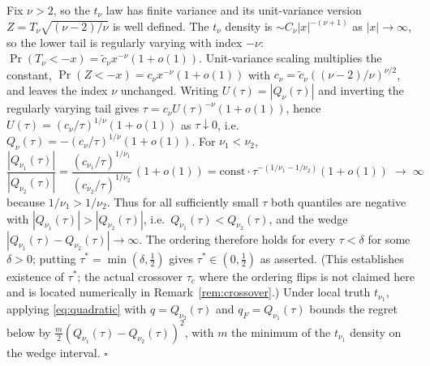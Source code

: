 \documentclass[11pt]{article}
\theoremstyle{remark}
\begin{document}
Fix $\nu>2$, so the $t_\nu$ law has finite variance and its
unit-variance version $Z=T_\nu\sqrt{(\nu-2)/\nu}$ is well defined. The
$t_\nu$ density is $\sim C_\nu|x|^{-(\nu+1)}$ as $|x|\to\infty$, so the
lower tail is regularly varying with index $-\nu$: $\Pr(T_\nu<-x)=
\tilde c_\nu x^{-\nu}(1+o(1))$. Unit-variance scaling multiplies the
constant, $\Pr(Z<-x)=c_\nu x^{-\nu}(1+o(1))$ with
$c_\nu=\tilde c_\nu((\nu-2)/\nu)^{\nu/2}$, and leaves the index $\nu$
unchanged. Writing $U(\tau)=|Q_\nu(\tau)|$ and inverting the regularly
varying tail \citep{embrechts1997} gives $\tau=c_\nu U(\tau)^{-\nu}
(1+o(1))$, hence $U(\tau)=(c_\nu/\tau)^{1/\nu}(1+o(1))$ as
$\tau\downarrow0$, i.e.\ $Q_\nu(\tau)=-(c_\nu/\tau)^{1/\nu}(1+o(1))$.
For $\nu_1<\nu_2$,
\[
\frac{|Q_{\nu_1}(\tau)|}{|Q_{\nu_2}(\tau)|}
=\frac{(c_{\nu_1}/\tau)^{1/\nu_1}}{(c_{\nu_2}/\tau)^{1/\nu_2}}\,(1+o(1))
=\text{const}\cdot\tau^{-(1/\nu_1-1/\nu_2)}(1+o(1))\;\longrightarrow\;\infty
\]
because $1/\nu_1>1/\nu_2$. Thus for all sufficiently small $\tau$ both
quantiles are negative with $|Q_{\nu_1}(\tau)|>|Q_{\nu_2}(\tau)|$, i.e.\
$Q_{\nu_1}(\tau)<Q_{\nu_2}(\tau)$, and the wedge
$|Q_{\nu_1}(\tau)-Q_{\nu_2}(\tau)|\to\infty$. The ordering therefore
holds for every $\tau<\delta$ for some $\delta>0$; putting
$\tau^*=\min(\delta,\tfrac12)$ gives $\tau^*\in(0,\tfrac12)$ as
asserted. (This establishes existence of $\tau^*$; the actual
crossover $\tau_c$ where the ordering flips is not claimed here and is
located numerically in Remark~\ref{rem:crossover}.) Under local truth
$t_{\nu_1}$, applying \eqref{eq:quadratic} with $q=Q_{\nu_2}(\tau)$ and
$q_F=Q_{\nu_1}(\tau)$ bounds the regret below by
$\tfrac{m}{2}(Q_{\nu_1}(\tau)-Q_{\nu_2}(\tau))^2$, with $m$ the minimum
of the $t_{\nu_1}$ density on the wedge interval. \hfill$\square$
\end{document}
